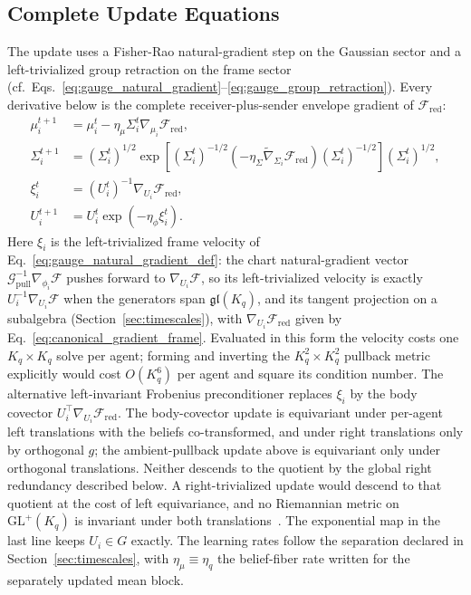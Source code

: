 \documentclass[11pt]{article}
\begin{document}
\subsection*{Complete Update Equations}

The update uses a Fisher-Rao natural-gradient step on the Gaussian sector and a left-trivialized group retraction on the frame sector (cf.\ Eqs.~\eqref{eq:gauge_natural_gradient}--\eqref{eq:gauge_group_retraction}). Every derivative below is the complete receiver-plus-sender envelope gradient of $\mathcal{F}_{\mathrm{red}}$:
\begin{align}
\mu_i^{t+1} &= \mu_i^t - \eta_\mu \Sigma_i^t \nabla_{\mu_i} \mathcal{F}_{\mathrm{red}}, \\
\Sigma_i^{t+1} &= \left(\Sigma_i^t\right)^{1/2} \exp\left[\left(\Sigma_i^t\right)^{-1/2}\left(-\eta_\Sigma \tilde{\nabla}_{\Sigma_i} \mathcal{F}_{\mathrm{red}}\right)\left(\Sigma_i^t\right)^{-1/2}\right] \left(\Sigma_i^t\right)^{1/2}, \\
\xi_i^t &= \left(U_i^t\right)^{-1}\nabla_{U_i} \mathcal{F}_{\mathrm{red}}, \\
U_i^{t+1} &= U_i^t \exp\left(-\eta_\phi \xi_i^t\right).
\end{align}
Here $\xi_i$ is the left-trivialized frame velocity of Eq.~\eqref{eq:gauge_natural_gradient_def}: the chart natural-gradient vector $\mathcal{G}_{\mathrm{pull}}^{-1}\nabla_{\phi_i}\mathcal{F}$ pushes forward to $\nabla_{U_i}\mathcal{F}$, so its left-trivialized velocity is exactly $U_i^{-1}\nabla_{U_i}\mathcal{F}$ when the generators span $\mathfrak{gl}(K_q)$, and its tangent projection on a subalgebra (Section~\ref{sec:timescales}), with $\nabla_{U_i}\mathcal{F}_{\mathrm{red}}$ given by Eq.~\eqref{eq:canonical_gradient_frame}. Evaluated in this form the velocity costs one $K_q \times K_q$ solve per agent; forming and inverting the $K_q^2 \times K_q^2$ pullback metric explicitly would cost $O(K_q^6)$ per agent and square its condition number. The alternative left-invariant Frobenius preconditioner replaces $\xi_i$ by the body covector $U_i^\top\nabla_{U_i}\mathcal{F}_{\mathrm{red}}$. The body-covector update is equivariant under per-agent left translations with the beliefs co-transformed, and under right translations only by orthogonal $g$; the ambient-pullback update above is equivariant only under orthogonal translations. Neither descends to the quotient by the global right redundancy described below. A right-trivialized update would descend to that quotient at the cost of left equivariance, and no Riemannian metric on $\mathrm{GL}^+(K_q)$ is invariant under both translations~\cite{Milnor1976}. The exponential map in the last line keeps $U_i \in G$ exactly. The learning rates follow the separation declared in Section~\ref{sec:timescales}, with $\eta_\mu \equiv \eta_q$ the belief-fiber rate written for the separately updated mean block.
\end{document}
